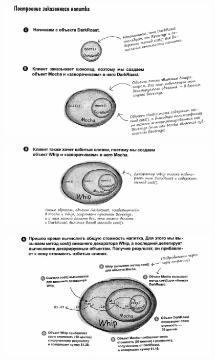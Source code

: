 \documentclass{beamer}
\begin{document}
\begin{frame}
\begin{figure}[h]
\centering
\includegraphics[scale=0.5]{images/lec10-pic12.png}
\label{pic-sort}
\end{figure}
\end{frame}

\begin{frame}
\begin{figure}[h]
\centering
\includegraphics[scale=0.5]{images/lec10-pic13.png}
\label{pic-sort}
\end{figure}
\end{frame}

\begin{frame}
\begin{figure}[h]
\centering
\includegraphics[scale=0.5]{images/lec10-pic14.png}
\label{pic-sort}
\end{figure}
\end{frame}
\end{document}

